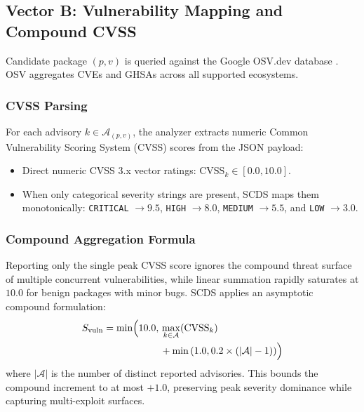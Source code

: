 \subsection{Vector B: Vulnerability Mapping and Compound CVSS}
\label{sec:method_vuln}
Candidate package $(p, v)$ is queried against the Google OSV.dev database \cite{osv2024database}. OSV aggregates CVEs and GHSAs across all supported ecosystems.

\subsubsection{CVSS Parsing}
For each advisory $k \in \mathcal{A}_{(p, v)}$, the analyzer extracts numeric Common Vulnerability Scoring System (CVSS) scores from the JSON payload:
\begin{itemize}
    \item Direct numeric CVSS 3.x vector ratings: $\text{CVSS}_k \in [0.0, 10.0]$.
    \item When only categorical severity strings are present, SCDS maps them monotonically: \texttt{CRITICAL} $\to 9.5$, \texttt{HIGH} $\to 8.0$, \texttt{MEDIUM} $\to 5.5$, and \texttt{LOW} $\to 3.0$.
\end{itemize}

\subsubsection{Compound Aggregation Formula}
Reporting only the single peak CVSS score ignores the compound threat surface of multiple concurrent vulnerabilities, while linear summation rapidly saturates at $10.0$ for benign packages with minor bugs. SCDS applies an asymptotic compound formulation:
\begin{equation}
\begin{split}
S_{\text{vuln}} = \min \Bigl( 10.0, \, & \max_{k \in \mathcal{A}} (\text{CVSS}_k) \\
& + \min\left(1.0, 0.2 \times (|\mathcal{A}| - 1)\right) \Bigr)
\end{split}
\end{equation}
where $|\mathcal{A}|$ is the number of distinct reported advisories. This bounds the compound increment to at most $+1.0$, preserving peak severity dominance while capturing multi-exploit surfaces.

